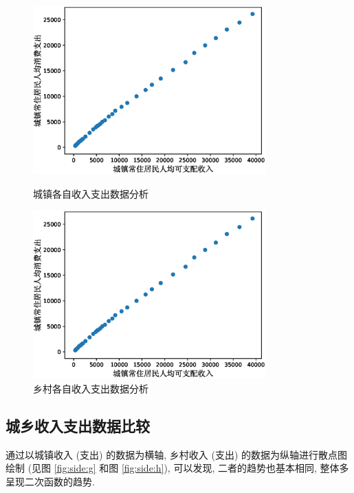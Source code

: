 \documentclass{article}
\begin{document}
\begin{figure}[H]
  \centering
  \begin{minipage}[t]{0.48\textwidth}
    \centering
    \includegraphics[width=0.8\textwidth]{figures/comparison1.eps}
    \caption{城镇各自收入支出数据分析}
    \label{fig:side:e}
  \end{minipage}
  \begin{minipage}[t]{0.48\textwidth}
    \centering
    \includegraphics[width=0.8\textwidth]{figures/comparison1.eps}
    \caption{乡村各自收入支出数据分析}
    \label{fig:side:f}
  \end{minipage}
\end{figure}

\subsection{城乡收入支出数据比较}

\par 通过以城镇收入 (支出) 的数据为横轴, 乡村收入 (支出) 的数据为纵轴进行散点图绘制 (见图 \ref{fig:side:g} 和图 \ref{fig:side:h}), 可以发现, 二者的趋势也基本相同, 整体多呈现二次函数的趋势.\\
\end{document}
